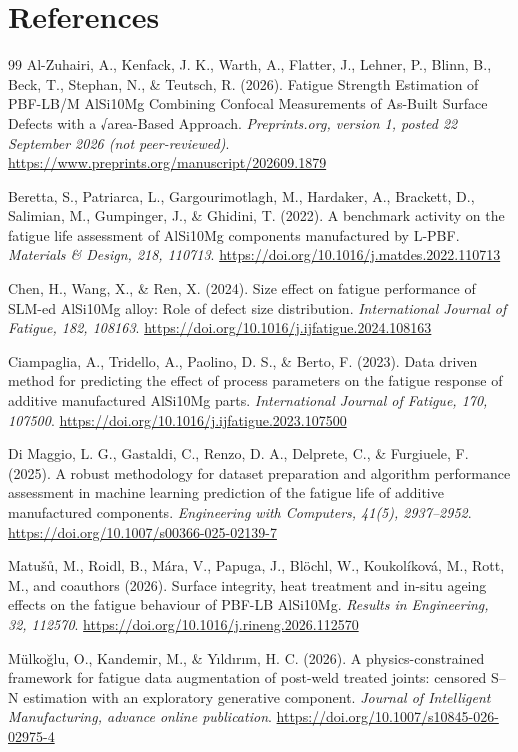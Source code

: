 \documentclass[12pt,a4paper]{article}
\begin{document}
\section*{References}
\begin{thebibliography}{99}
Al-Zuhairi, A., Kenfack, J. K., Warth, A., Flatter, J., Lehner, P., Blinn, B., Beck, T., Stephan, N., \& Teutsch, R. (2026). Fatigue Strength Estimation of PBF-LB/M AlSi10Mg Combining Confocal Measurements of As-Built Surface Defects with a √area-Based Approach. \emph{Preprints.org, version 1, posted 22 September 2026 (not peer-reviewed)}. \url{https://www.preprints.org/manuscript/202609.1879}

Beretta, S., Patriarca, L., Gargourimotlagh, M., Hardaker, A., Brackett, D., Salimian, M., Gumpinger, J., \& Ghidini, T. (2022). A benchmark activity on the fatigue life assessment of AlSi10Mg components manufactured by L-PBF. \emph{Materials \& Design, 218, 110713}. \url{https://doi.org/10.1016/j.matdes.2022.110713}

Chen, H., Wang, X., \& Ren, X. (2024). Size effect on fatigue performance of SLM-ed AlSi10Mg alloy: Role of defect size distribution. \emph{International Journal of Fatigue, 182, 108163}. \url{https://doi.org/10.1016/j.ijfatigue.2024.108163}

Ciampaglia, A., Tridello, A., Paolino, D. S., \& Berto, F. (2023). Data driven method for predicting the effect of process parameters on the fatigue response of additive manufactured AlSi10Mg parts. \emph{International Journal of Fatigue, 170, 107500}. \url{https://doi.org/10.1016/j.ijfatigue.2023.107500}

Di Maggio, L. G., Gastaldi, C., Renzo, D. A., Delprete, C., \& Furgiuele, F. (2025). A robust methodology for dataset preparation and algorithm performance assessment in machine learning prediction of the fatigue life of additive manufactured components. \emph{Engineering with Computers, 41(5), 2937–2952}. \url{https://doi.org/10.1007/s00366-025-02139-7}

Matušů, M., Roidl, B., Mára, V., Papuga, J., Blöchl, W., Koukolíková, M., Rott, M., and coauthors (2026). Surface integrity, heat treatment and in-situ ageing effects on the fatigue behaviour of PBF-LB AlSi10Mg. \emph{Results in Engineering, 32, 112570}. \url{https://doi.org/10.1016/j.rineng.2026.112570}

Mülkoğlu, O., Kandemir, M., \& Yıldırım, H. C. (2026). A physics-constrained framework for fatigue data augmentation of post-weld treated joints: censored S–N estimation with an exploratory generative component. \emph{Journal of Intelligent Manufacturing, advance online publication}. \url{https://doi.org/10.1007/s10845-026-02975-4}


\end{thebibliography}
\end{document}
